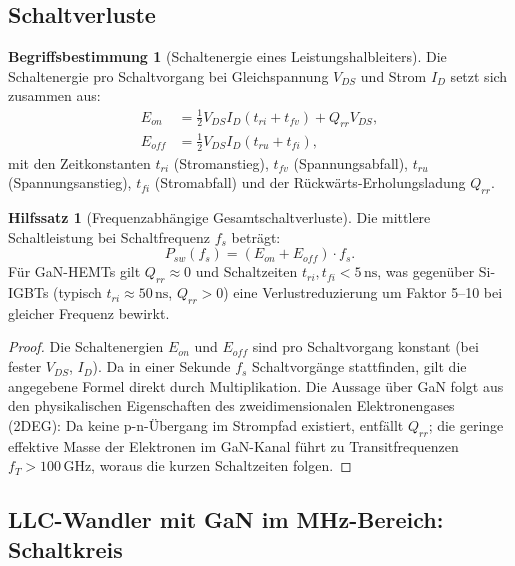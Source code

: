 ﻿\documentclass[a4paper,12pt,openany,oneside]{book}
\newcommand{\unterabschnitt}[1]{\subsection{#1}}
\theoremstyle{definition}
\newtheorem{definition}{Begriffsbestimmung}[chapter]
\newtheorem{lemma}{Hilfssatz}[chapter]
\begin{document}
\unterabschnitt{Schaltverluste}

\begin{definition}[Schaltenergie eines Leistungshalbleiters]
  Die Schaltenergie pro Schaltvorgang bei Gleichspannung $V_{DS}$ und Strom $I_D$
  setzt sich zusammen aus:
  \begin{align*}
    E_{on}  &= \frac{1}{2}V_{DS}I_D(t_{ri} + t_{fv}) + Q_{rr}V_{DS}, \\
    E_{off} &= \frac{1}{2}V_{DS}I_D(t_{ru} + t_{fi}),
  \end{align*}
  mit den Zeitkonstanten $t_{ri}$ (Stromanstieg), $t_{fv}$ (Spannungsabfall),
  $t_{ru}$ (Spannungsanstieg), $t_{fi}$ (Stromabfall) und der
  R\"uckw\"arts-Erholungsladung $Q_{rr}$.
\end{definition}

\begin{lemma}[Frequenzabh\"angige Gesamtschaltverluste]
\label{hilfssatz:schaltverl}
  Die mittlere Schaltleistung bei Schaltfrequenz $f_s$ betr\"agt:
  \[
    P_{sw}(f_s) = (E_{on} + E_{off}) \cdot f_s.
  \]
  F\"ur GaN-HEMTs gilt $Q_{rr} \approx 0$ und Schaltzeiten $t_{ri}, t_{fi} < 5\,\mathrm{ns}$,
  was gegen\"uber Si-IGBTs (typisch $t_{ri} \approx 50\,\mathrm{ns}$, $Q_{rr} > 0$) eine
  Verlustreduzierung um Faktor 5--10 bei gleicher Frequenz bewirkt.
\end{lemma}

\begin{proof}
  Die Schaltenergien $E_{on}$ und $E_{off}$ sind pro Schaltvorgang konstant (bei fester
  $V_{DS}$, $I_D$). Da in einer Sekunde $f_s$ Schaltvorg\"ange stattfinden, gilt die
  angegebene Formel direkt durch Multiplikation. Die Aussage \"uber GaN folgt aus den
  physikalischen Eigenschaften des zweidimensionalen Elektronengases (2DEG): Da keine
  p-n-\"Ubergang im Strompfad existiert, entf\"allt $Q_{rr}$; die geringe effektive Masse
  der Elektronen im GaN-Kanal f\"uhrt zu Transitfrequenzen $f_T > 100\,\mathrm{GHz}$,
  woraus die kurzen Schaltzeiten folgen.
\end{proof}

\unterabschnitt{LLC-Wandler mit GaN im MHz-Bereich: Schaltkreis}
\end{document}
